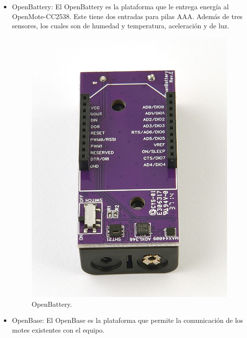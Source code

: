 \documentclass[journal]{IEEEtran}
\begin{document}
\begin{itemize}
        \item OpenBattery: El OpenBattery es la plataforma que le entrega energía al OpenMote-CC2538. Este tiene dos entradas para pilas AAA. Además de tres sensores, los cuales son de humedad y temperatura, aceleración y de luz.
        \begin{figure}[!ht]
			\begin{center}
			\includegraphics[scale=0.3]{openbattery.jpg}
			\end{center}			            
			\caption{OpenBattery.}        
        \end{figure}
        \item OpenBase: El OpenBase es la plataforma que permite la comunicación de los motes existentes con el equipo.
        \begin{figure}[!ht]
			\begin{center}

\end{center}
\end{figure}
\end{itemize}
\end{document}
